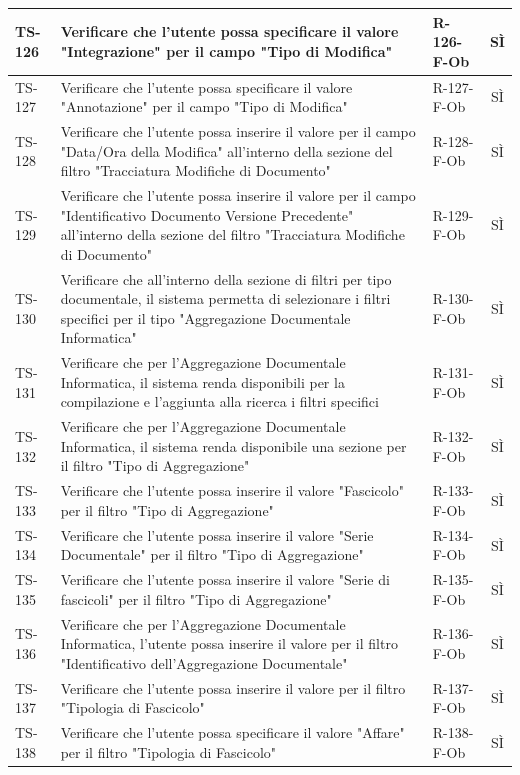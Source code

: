 \documentclass[a4paper,12pt]{article}
\begin{document}
\begin{longtable}{|p{1.5cm}|p{8.3cm}|p{2.4cm}|c|}
\hline
TS-126 & Verificare che l'utente possa specificare il valore "Integrazione" per il campo "Tipo di Modifica" & R-126-F-Ob & SÌ \\
\hline
TS-127 & Verificare che l'utente possa specificare il valore "Annotazione" per il campo "Tipo di Modifica" & R-127-F-Ob & SÌ \\
\hline
TS-128 & Verificare che l'utente possa inserire il valore per il campo "Data/Ora della Modifica" all'interno della sezione del filtro "Tracciatura Modifiche di Documento" & R-128-F-Ob & SÌ \\
\hline
TS-129 & Verificare che l'utente possa inserire il valore per il campo "Identificativo Documento Versione Precedente" all'interno della sezione del filtro "Tracciatura Modifiche di Documento" & R-129-F-Ob & SÌ \\
\hline
TS-130 & Verificare che all'interno della sezione di filtri per tipo documentale, il sistema permetta di selezionare i filtri specifici per il tipo "Aggregazione Documentale Informatica" & R-130-F-Ob & SÌ \\
\hline
TS-131 & Verificare che per l'Aggregazione Documentale Informatica, il sistema renda disponibili per la compilazione e l'aggiunta alla ricerca i filtri specifici & R-131-F-Ob  & SÌ \\
\hline
TS-132 & Verificare che per l'Aggregazione Documentale Informatica, il sistema renda disponibile una sezione per il filtro "Tipo di Aggregazione" & R-132-F-Ob & SÌ \\
\hline
TS-133 & Verificare che l'utente possa inserire il valore "Fascicolo" per il filtro "Tipo di Aggregazione" & R-133-F-Ob & SÌ \\
\hline
TS-134 & Verificare che l'utente possa inserire il valore "Serie Documentale" per il filtro "Tipo di Aggregazione" & R-134-F-Ob & SÌ \\
\hline
TS-135 & Verificare che l'utente possa inserire il valore "Serie di fascicoli" per il filtro "Tipo di Aggregazione" & R-135-F-Ob & SÌ \\
\hline
TS-136 & Verificare che per l'Aggregazione Documentale Informatica, l'utente possa inserire il valore per il filtro "Identificativo dell'Aggregazione Documentale" & R-136-F-Ob & SÌ \\
\hline
TS-137 & Verificare che l'utente possa inserire il valore per il filtro "Tipologia di Fascicolo" & R-137-F-Ob & SÌ \\
\hline
TS-138 & Verificare che l'utente possa specificare il valore "Affare" per il filtro "Tipologia di Fascicolo" & R-138-F-Ob & SÌ \\

\end{longtable}
\end{document}
